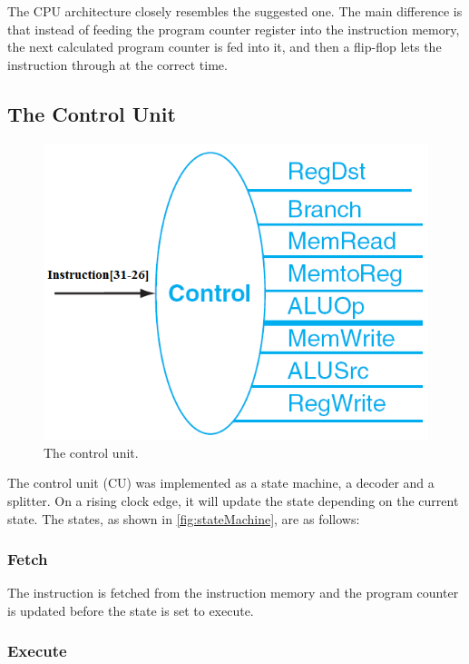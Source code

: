 The CPU architecture closely resembles the suggested one.
The main difference is that instead of feeding the program counter register into the instruction memory, %
the next calculated program counter is fed into it, and then a flip-flop lets the instruction through at the correct time.

\subsection{The Control Unit}
\begin{figure}[ht]
    \centering
    \includegraphics[scale=0.3]{figures/controlunit.png}
    \caption{\label{fig:controlUnit}The control unit.}
\end{figure}

The control unit (CU) was implemented as a state machine, a decoder and a splitter.
On a rising clock edge, it will update the state depending on the current
state. The states, as shown in \ref{fig:stateMachine}, are as follows:

\subsubsection{Fetch}

The instruction is fetched from the instruction memory
and the program counter is updated before the state is set to execute.

\subsubsection{Execute}

